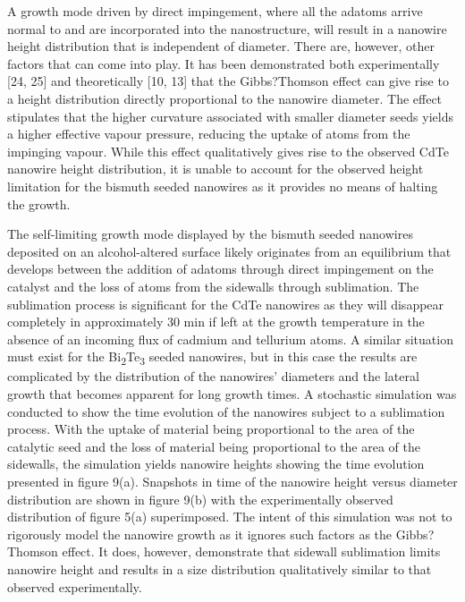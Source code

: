 A growth mode driven by direct impingement, where all
the adatoms arrive normal to and are incorporated into the
nanostructure, will result in a nanowire height distribution
that is independent of diameter. There are, however, other
factors that can come into play. It has been demonstrated
both experimentally [24, 25] and theoretically [10, 13] that the
Gibbs?Thomson effect can give rise to a height distribution
directly proportional to the nanowire diameter. The effect
stipulates that the higher curvature associated with smaller
diameter seeds yields a higher effective vapour pressure,
reducing the uptake of atoms from the impinging vapour.
While this effect qualitatively gives rise to the observed CdTe
nanowire height distribution, it is unable to account for the
observed height limitation for the bismuth seeded nanowires
as it provides no means of halting the growth.

The self-limiting growth mode displayed by the bismuth
seeded nanowires deposited on an alcohol-altered surface
likely originates from an equilibrium that develops between the
addition of adatoms through direct impingement on the catalyst
and the loss of atoms from the sidewalls through sublimation.
The sublimation process is significant for the CdTe nanowires
as they will disappear completely in approximately 30 min if
left at the growth temperature in the absence of an incoming
flux of cadmium and tellurium atoms. A similar situation must
exist for the Bi\textsubscript{2}Te\textsubscript{3} seeded nanowires, but in this case the results are complicated by the distribution of the nanowires'
diameters and the lateral growth that becomes apparent for
long growth times. A stochastic simulation was conducted
to show the time evolution of the nanowires subject to a
sublimation process. With the uptake of material being
proportional to the area of the catalytic seed and the loss of
material being proportional to the area of the sidewalls, the
simulation yields nanowire heights showing the time evolution
presented in figure 9(a). Snapshots in time of the nanowire
height versus diameter distribution are shown in figure 9(b)
with the experimentally observed distribution of figure 5(a)
superimposed. The intent of this simulation was not to
rigorously model the nanowire growth as it ignores such factors
as the Gibbs?Thomson effect. It does, however, demonstrate
that sidewall sublimation limits nanowire height and results
in a size distribution qualitatively similar to that observed
experimentally.

